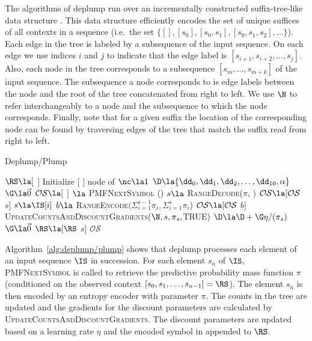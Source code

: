 The algorithms of deplump run over an incrementally constructed suffix-tree-like data structure \citep{Ukkonen1992}. This data structure efficiently encodes the set of unique suffices of all contexts in a sequence (i.e.~the set $\{ [ ], [s_0], [s_0,s_1], [s_0, s_1,s_2], \ldots \}$). Each edge in the tree is labeled by a subsequence of the input sequence.  On each edge we use indices $i$ and $j$ to indicate that the edge label is $[s_{i+1}, s_{i+2}, \ldots,s_{j}]$.  Also, each node in the tree corresponds to a subsequence $[s_m, \ldots, s_{m + k}]$ of the input sequence.  The subsequence a node corresponds to is edge labels between the node and the root of the tree concatenated from right to left. We use $\N$ to refer interchangeably to a node and the subsequence to which the node corresponds.  Finally, note that for a given suffix the location of the corresponding node can be found by traversing edges of the tree that match the suffix read from right to left. 

\begin{algorithm}[t]
    \caption{Deplump/Plump} \label{alg:deplump/plump}
    \begin{algorithmic}[1]
		\State $\RS \la [$ $]  $ 
		\State Initialize $[$ $]$ node of \T {}
		\State $\nc \la 1$ 
		\State $\D \la  \{ \dd_0, \dd_1, \dd_2, \dots, \dd_{10}, \alpha \}$ 
		\State $\G \la \vec 0$ 
		\State $\mathcal{O}\mathcal{S} \la  [$ $]$ 
			\State [$\pi$, \N] $\la$ \textsc{PMFNextSymbol} (\RS)
				\State $s \la $ \textsc{RangeDecode}($\pi$, \IS)
				\State $\mathcal{O}\mathcal{S} \la [\mathcal{O}\mathcal{S}$ $s]$
			\Else
				\State $s \la \IS[i]$
				\State $b \la$ \textsc{RangeEncode}$(\Sigma_{i = 1}^{s-1} \pi_i, \Sigma_{i = 1}^{s} \pi_i$)
				\State $\mathcal{O}\mathcal{S} \la [\mathcal{O}\mathcal{S}$ $b]$		
			\EndIf
			\State \textsc{UpdateCountsAndDiscountGradients}($\N,s,\pi_s,$TRUE)
			\State $\D \la \D + \G \eta / (\pi_s)$ 
			\State $\G \la \vec 0$ 
			\State $\RS \la [\RS$ $s]$ 
		\EndFor
		\State \Return $\mathcal{O}\mathcal{S}$
	\EndProcedure
	\end{algorithmic}
\end{algorithm}

Algorithm~\ref{alg:deplump/plump} shows that deplump processes each element of an input sequence $\IS$ in succession.  For each element $s_n$ of $\IS$, \textsc{PMFNextSymbol} is called to retrieve the predictive probability mass function $\pi$ (conditioned on the observed context $[s_0, s_1, \ldots, s_{n-1}] = \RS$).  The element $s_n$ is then encoded by an entropy encoder with parameter $\pi$.  The counts in the tree are updated and the gradients for the discount parameters are calculated by \textsc{UpdateCountsAndDiscountGradients}. The discount parameters are updated based on a learning rate $\eta$ and the encoded symbol in appended to $\RS$.

